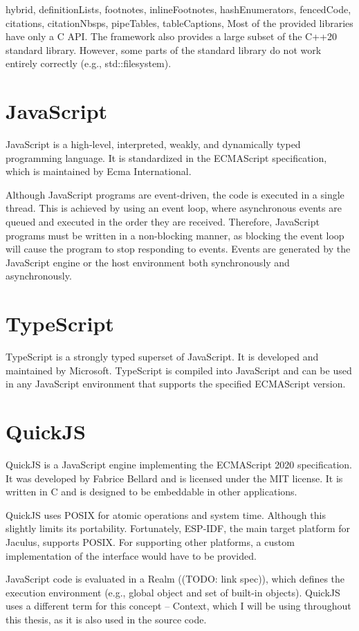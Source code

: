 \documentclass[
  digital,
  oneside,
  nosansbold,
  nocolorbold,
  lof,
  lot
]{fithesis4}
\begin{document}
\begin{markdown*}{%
  hybrid,
  definitionLists,
  footnotes,
  inlineFootnotes,
  hashEnumerators,
  fencedCode,
  citations,
  citationNbsps,
  pipeTables,
  tableCaptions,
}
Most of the provided libraries have only a C API. The framework also provides a large subset of the C++20 standard library. However, some parts of the standard library do not work entirely correctly (e.g., std::filesystem).

\section{JavaScript}

JavaScript is a high-level, interpreted, weakly, and dynamically typed programming language. It is standardized in the ECMAScript specification, which is maintained by Ecma International.

Although JavaScript programs are event-driven, the code is executed in a single thread. This is achieved by using an event loop, where asynchronous events are queued and executed in the order they are received. Therefore, JavaScript programs must be written in a non-blocking manner, as blocking the event loop will cause the program to stop responding to events. Events are generated by the JavaScript engine or the host environment both synchronously and asynchronously.

\section{TypeScript}

TypeScript is a strongly typed superset of JavaScript. It is developed and maintained by Microsoft. TypeScript is compiled into JavaScript and can be used in any JavaScript environment that supports the specified ECMAScript version.

\section{QuickJS}

QuickJS is a JavaScript engine implementing the ECMAScript 2020 specification. It was developed by Fabrice Bellard and is licensed under the MIT license. It is written in C and is designed to be embeddable in other applications.

QuickJS uses POSIX for atomic operations and system time. Although this slightly limits its portability. Fortunately, ESP-IDF, the main target platform for Jaculus, supports POSIX. For supporting other platforms, a custom implementation of the interface would have to be provided.

JavaScript code is evaluated in a Realm ((TODO: link spec)), which defines the execution environment (e.g., global object and set of built-in objects). QuickJS uses a different term for this concept -- Context, which I will be using throughout this thesis, as it is also used in the source code.



\end{markdown*}
\end{document}
